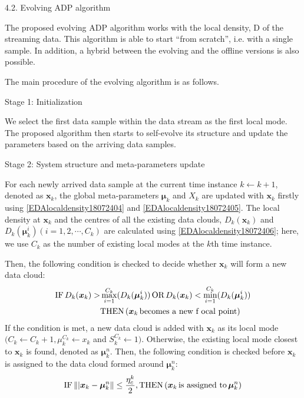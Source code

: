 4.2. Evolving ADP algorithm

The proposed evolving ADP algorithm works with the local density, D of the streaming data. This algorithm is able to start “from scratch”, i.e. with a single sample. In addition, a hybrid between the evolving and the offline versions is also possible.

The main procedure of the evolving algorithm is as follows.

Stage 1: Initialization

We select the first data sample within the data stream as the first local mode. The proposed algorithm then starts to self-evolve its structure and update the parameters based on the arriving data samples.

Stage 2: System structure and meta-parameters update

For each newly arrived data sample at the current time instance $k \leftarrow k + 1$, denoted as $\bm x_k$, the global meta-parameters $\bm \mu_k$ and $X_k$ are updated with $\bm x_k$ firstly using \eqref{EDAlocaldensity18072404} and \eqref{EDAlocaldensity18072405}. The local density at $\bm x_k$ and the centres of all the existing data clouds, $D_k(\bm x_k)$ and $D_k(\bm \mu^i _k) (i = 1, 2, \cdots ,C_k)$ are calculated using \eqref{EDAlocaldensity18072406}; here, we use $C_k$ as the number of existing local modes at the $k$th
time instance.

Then, the following condition \cite{Angelov2012Autonomous} is checked to decide whether $\bm x_k$ will form a new data cloud:
\begin{align}\label{EDAlocaldensity18072417}
  \textup{IF}\, D_k(\bm x_k) > &\max_{i=1}^{C_k } (D_k(\bm \mu^i _k))\, \textup{OR}\, D_k(\bm x_k) < \min_{i=1}^ {C_k} (D_k(\bm \mu^i _k))\notag\\
    &\textup{THEN}\, (\bm x_k\,  \textup{becomes a new f ocal point})
\end{align}
If the condition is met, a new data cloud is added with $\bm x_k$ as its local mode $(C_k \leftarrow C_k + 1,\mu_k^{C_k} \leftarrow x_k$ and $S_k^{C_k} \leftarrow 1)$.
Otherwise, the existing local mode closest to $\bm x_k$ is found, denoted as $\bm \mu^n_k$. Then, the following condition is checked before $\bm x_k$ is assigned to the data cloud formed around $\bm \mu^n_k$:
\begin{align}\label{EDAlocaldensity18072418}
  \textup{IF}\, \||\bm x_k - \bm\mu^n_k\| \leq \frac{\eta^k_c} 2, \textup{THEN}\, (\bm x_k\, \textup{is assigned to}\, \bm\mu^n_k)
\end{align}

